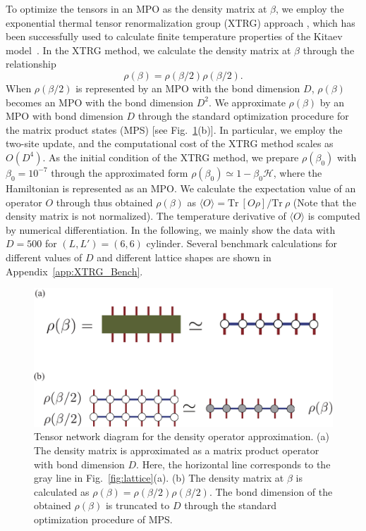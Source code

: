 \documentclass[twocolumn,superscriptaddress,showpacs, longbibliography, aps, prb]{revtex4-2}
\begin{document}
To optimize the tensors in an MPO as the density matrix at $\beta$, 
we employ the exponential thermal tensor renormalization group (XTRG) approach \cite{Chen2018,Li2020}, which has been successfully used to calculate %
finite temperature properties of the Kitaev model~\cite{Li2020}. In the XTRG method, 
we calculate the density matrix at $\beta$ through the relationship
\begin{equation}
 \rho(\beta)=\rho(\beta/2)\rho(\beta/2).
\end{equation}
When $\rho(\beta/2)$ is represented by an MPO with the bond dimension $D$, $\rho(\beta)$ becomes an MPO with the bond dimension $D^2$. We approximate $\rho(\beta)$ by an MPO with bond dimension $D$ through the standard optimization procedure for the matrix product states (MPS) \cite{Chen2018}  [see Fig.~\ref{fig:XTRG}(b)]. In particular, we employ the two-site update, and the %
computational cost of the XTRG %
method scales as $O(D^4)$. As the initial condition of the XTRG %
method, we prepare $\rho(\beta_0)$ with $\beta_0 = 10^{-7}$ through the approximated form $\rho(\beta_0) \simeq 1 - \beta_0\mathcal{H}$, where the Hamiltonian is represented as an MPO. We calculate the expectation value of an operator ${O}$ through thus obtained $\rho(\beta)$ as $\langle {O} \rangle = \mathrm{Tr}~[{O}\rho] /\mathrm{Tr}~\rho$ (Note that the density matrix is not normalized). 
The temperature derivative of $\langle {O} \rangle$ is computed %
by numerical differentiation.
In the following, we mainly show the data with $D=500$ for $(L, L') = (6, 6)$ cylinder. Several benchmark calculations for different values of $D$ and %
different lattice shapes %
are shown in Appendix~\ref{app:XTRG_Bench}. 

\begin{figure}
  \begin{center}
    \includegraphics[width=\linewidth]{Figs/XTRG_MPO.pdf}
  \end{center}
  \caption{Tensor network diagram for the density operator approximation. (a) The density matrix is approximated as a matrix product operator with bond dimension $D$. Here, the horizontal line corresponds to the gray line in Fig.~\ref{fig:lattice}(a). (b) The density matrix at $\beta$ is calculated as $\rho(\beta)=\rho(\beta/2)\rho(\beta/2)$. The bond dimension of the obtained $\rho(\beta)$ is truncated to $D$ through the standard optimization procedure of MPS.}
  \label{fig:XTRG}
\end{figure}
\end{document}
